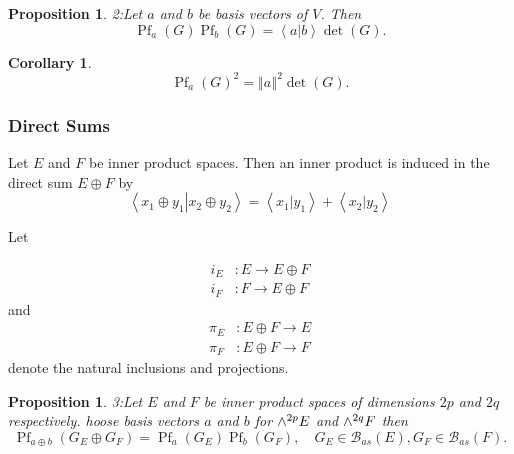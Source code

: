\documentclass[aps,preprint]{revtex4}%
\newtheorem{corollary}[theorem]{Corollary}
\newtheorem{proposition}[theorem]{Proposition}
\begin{document}
\begin{proposition}
2:Let $a$ and $b$ be basis vectors of $V$. Then%
\begin{equation}
\operatorname{Pf}_{a}\left(  G\right)  \operatorname{Pf}_{b}\left(  G\right)
=\left\langle \left.  a\right\vert b\right\rangle \det\left(  G\right)  .
\end{equation}

\end{proposition}

\begin{corollary}%
\begin{equation}
\operatorname{Pf}_{a}\left(  G\right)  ^{2}=\left\Vert a\right\Vert ^{2}%
\det\left(  G\right)  .
\end{equation}

\end{corollary}

\subsubsection{Direct Sums}

Let $E$ and $F$ be inner product spaces. Then an inner product is induced in
the direct sum $E\oplus F$ by%
\begin{equation}
\left\langle \left.  x_{1}\oplus y_{1}\right\vert x_{2}\oplus y_{2}%
\right\rangle =\left\langle \left.  x_{1}\right\vert y_{1}\right\rangle
+\left\langle \left.  x_{2}\right\vert y_{2}\right\rangle
\end{equation}


Let%

\begin{align}
i_{E}  &  :E\rightarrow E\oplus F\\
i_{F}  &  :F\rightarrow E\oplus F
\end{align}
and
\begin{align}
\pi_{E}  &  :E\oplus F\rightarrow E\\
\pi_{F}  &  :E\oplus F\rightarrow F
\end{align}
denote the natural inclusions and projections.

\begin{proposition}
3:Let $E$ and $F$ be inner product spaces of dimensions $2p$ and $2q$
respectively. hoose basis vectors $a$ and $b$ for ${\LARGE \wedge}^{2p}E$ and
${\LARGE \wedge}^{2q}F$ then
\begin{equation}
\operatorname{Pf}_{a\oplus b}\left(  G_{E}\oplus G_{F}\right)
=\operatorname{Pf}_{a}\left(  G_{E}\right)  \operatorname{Pf}_{b}\left(
G_{F}\right)  ,\quad G_{E}\in\mathcal{B}_{as}\left(  E\right)  ,G_{F}%
\in\mathcal{B}_{as}\left(  F\right)  .
\end{equation}

\end{proposition}
\end{document}

